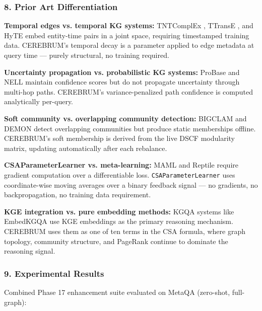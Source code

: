 \subsubsection{8. Prior Art Differ\-entiation}

\textbf{Temporal edges vs. temporal KG systems:} TNTComplEx \cite{lacroix2020tntcomplex}, TTransE \cite{lin2015ttranse}, and HyTE \cite{sun2017hyte} embed entity-time pairs in a joint space, requiring timestamped training data. CEREBRUM's temporal decay is a parameter applied to edge metadata at query time — purely structural, no training required.

\textbf{Uncertainty propagation vs. proba\-bilistic KG systems:} ProBase \cite{wu2012probase} and NELL \cite{carlson2010nell} maintain confidence scores but do not propagate uncertainty through multi-hop paths. CEREBRUM's variance-penalized path confidence is computed analy\-tically per-query.

\textbf{Soft community vs. overlapping community detection:} BIGCLAM \cite{yang2013bigclam} and DEMON \cite{coscia2012demon} detect overlapping communities but produce static memberships offline. CEREBRUM's soft membership is derived from the live DSCF modularity matrix, updating autom\-atically after each rebalance.

\textbf{CSAParameterLearner vs. meta-learning:} MAML \cite{finn2017maml} and Reptile \cite{nichol2018reptile} require gradient computation over a diffe\-rentiable loss. \texttt{CSAParameterLearner} uses coordinate-wise moving averages over a binary feedback signal — no gradients, no backp\-ropagation, no training data requirement.

\textbf{KGE integration vs. pure embedding methods:} KGQA systems like EmbedKGQA \cite{saxena2020improve} use KGE embeddings as the primary reasoning mechanism. CEREBRUM uses them as one of ten terms in the CSA formula, where graph topology, community structure, and PageRank continue to dominate the reasoning signal.

\subsubsection{9. Experi\-mental Results}

Combined Phase 17 enhancement suite evaluated on MetaQA (zero-shot, full-graph):

